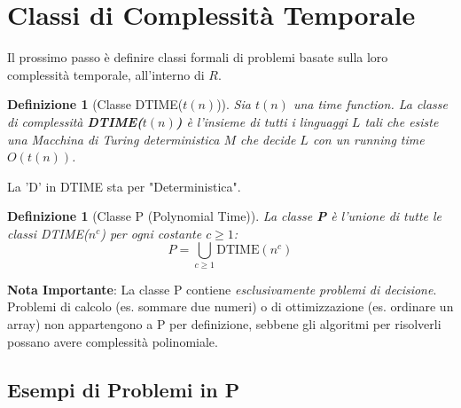 \documentclass[a4paper, 11pt]{book} %
\newtheorem{definition}[theorem]{Definizione}
\theoremstyle{definition}
\begin{document}
\section{Classi di Complessità Temporale}

Il prossimo passo è definire classi formali di problemi basate sulla loro complessità temporale, all'interno di $R$.

\begin{definition}[Classe DTIME($t(n)$)]
Sia $t(n)$ una time function. La classe di complessità \textbf{DTIME($t(n)$)} è l'insieme di tutti i linguaggi $L$ tali che esiste una Macchina di Turing \emph{deterministica} $M$ che decide $L$ con un running time $O(t(n))$.
\end{definition}
La 'D' in DTIME sta per "Deterministica".

\begin{definition}[Classe P (Polynomial Time)]
La classe \textbf{P} è l'unione di tutte le classi DTIME($n^c$) per ogni costante $c \ge 1$:
\[ P = \bigcup_{c \ge 1} \text{DTIME}(n^c) \]
\end{definition}
\textbf{Nota Importante}: La classe P contiene \emph{esclusivamente problemi di decisione}. Problemi di calcolo (es. sommare due numeri) o di ottimizzazione (es. ordinare un array) non appartengono a P per definizione, sebbene gli algoritmi per risolverli possano avere complessità polinomiale.

\subsection{Esempi di Problemi in P}
\end{document}
